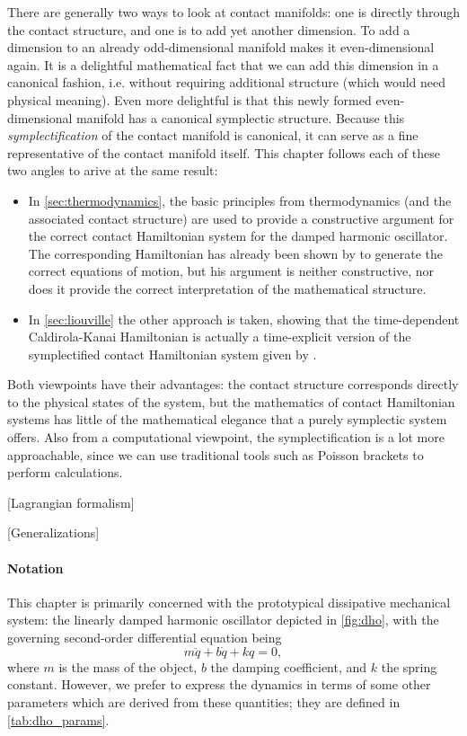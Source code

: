 There are generally two ways to look at contact manifolds: one is directly through the contact structure, and one is to add yet another dimension. To add a dimension to an already odd-dimensional manifold makes it even-dimensional again. It is a delightful mathematical fact that we can add this dimension in a canonical fashion, i.e. without requiring additional structure (which would need physical meaning). Even more delightful is that this newly formed even-dimensional manifold has a canonical symplectic structure. Because this \emph{symplectification} of the contact manifold is canonical, it can serve as a fine representative of the contact manifold itself. This chapter follows each of these two angles to arive at the same result:
\begin{itemize}
    \item In \cref{sec:thermodynamics}, the basic principles from thermodynamics (and the associated contact structure) are used to provide a constructive argument for the correct contact Hamiltonian system for the damped harmonic oscillator. The corresponding Hamiltonian has already been shown by \citet{Bravetti2017} to generate the correct equations of motion, but his argument is neither constructive, nor does it provide the correct interpretation of the mathematical structure.
    \item In \cref{sec:liouville} the other approach is taken, showing that the time-dependent Caldirola-Kanai Hamiltonian is actually a time-explicit version of the symplectified contact Hamiltonian system given by \citeauthor{Bravetti2017}.
\end{itemize}
Both viewpoints have their advantages: the contact structure corresponds directly to the physical states of the system, but the mathematics of contact Hamiltonian systems has little of the mathematical elegance that a purely symplectic system offers. Also from a computational viewpoint, the symplectification is a lot more approachable, since we can use traditional tools such as Poisson brackets to perform calculations.

[Lagrangian formalism]

[Generalizations]

\paragraph{Notation} This chapter is primarily concerned with the prototypical dissipative mechanical system: the linearly damped harmonic oscillator depicted in \cref{fig:dho}, with the governing second-order differential equation being
\begin{equation}  
  m\ddot{q} + b\dot{q} + kq = 0,
\end{equation}
where $m$ is the mass of the object, $b$ the damping coefficient, and $k$ the spring constant. However, we prefer to express the dynamics in terms of some other parameters which are derived from these quantities; they are defined in \cref{tab:dho_params}.


